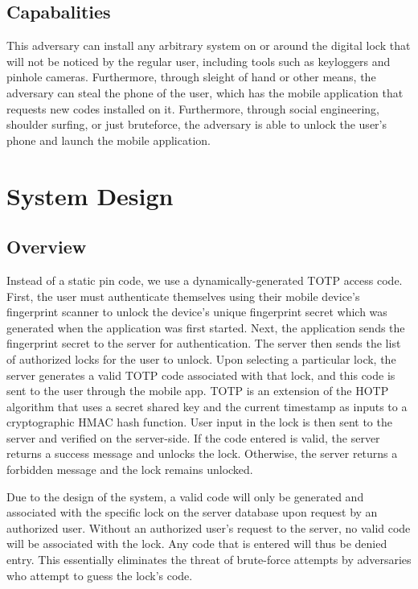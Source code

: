 \documentclass[conference]{IEEEtran}
\begin{document}
\subsection{Capabalities}
	This adversary can install any arbitrary system on or around the digital lock that will not be noticed by the regular user, including tools such as keyloggers and pinhole cameras. Furthermore, through sleight of hand or other means, the adversary can steal the phone of the user, which has the mobile application that requests new codes installed on it. Furthermore, through social engineering, shoulder surfing, or just bruteforce, the adversary is able to unlock the user’s phone and launch the mobile application.

\section{System Design}

\subsection{Overview}
	Instead of a static pin code, we use a dynamically-generated TOTP access code. First, the user must authenticate themselves using their mobile device’s fingerprint scanner to unlock the device’s unique fingerprint secret which was generated when the application was first started. Next, the application sends the fingerprint secret to the server for authentication. The server then sends the list of authorized locks for the user to unlock. Upon selecting a particular lock, the server generates a valid TOTP code associated with that lock, and this code is sent to the user through the mobile app. TOTP is an extension of the HOTP algorithm that uses a secret shared key and the current timestamp as inputs to a cryptographic HMAC hash function. User input in the lock is then sent to the server and verified on the server-side. If the code entered is valid, the server returns a success message and unlocks the lock. Otherwise, the server returns a forbidden message and the lock remains unlocked.
	
	Due to the design of the system, a valid code will only be generated and associated with the specific lock on the server database upon request by an authorized user. Without an authorized user’s request to the server, no valid code will be associated with the lock. Any code that is entered will thus be denied entry. This essentially eliminates the threat of brute-force attempts by adversaries who attempt to guess the lock’s code. 
	
\end{document}
